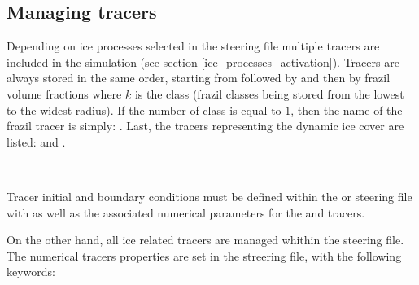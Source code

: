 

\subsection{Managing tracers}

Depending on ice processes selected in the \khione steering file multiple tracers
are included in the simulation (see section \ref{ice_processes_activation}).
Tracers are always stored in the same order, starting from
 followed by  and then by frazil volume fractions  where $k$ is the class (frazil classes being stored from the lowest to the widest radius).
If the number of class is equal to $1$, then the name of the frazil tracer is simply: . Last, the tracers representing the dynamic ice cover are listed:  and .

\

Tracer initial and boundary conditions must be defined within the  or 
steering file with as well as the associated numerical parameters for the  and  tracers.

On the other hand, all ice related tracers are managed whithin the \khione steering file.
The numerical tracers properties are set in the \khione streering file, with the following keywords:

